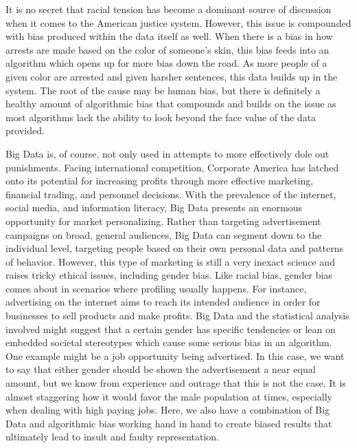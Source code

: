 \documentclass[sigconf]{acmart}
\begin{document}
It is no secret that racial tension has become a dominant source of discussion when it comes to the American justice system. However, this issue is compounded with bias produced within the data itself as well. When there is a bias in how arrests are made based on the color of someone's skin, this bias feeds into an algorithm which opens up for more bias down the road. As more people of a given color are arrested and given harsher sentences, this data builds up in the system. The root of the cause may be human bias, but there is definitely a healthy amount of algorithmic bias that compounds and builds on the issue as most algorithms lack the ability to look beyond the face value of the data provided\cite{Eckhouse2017}.

Big Data is, of course, not only used in attempts to more effectively dole out punishments. Facing international competition, Corporate America has latched onto its potential for increasing profits through more effective marketing, financial trading, and personnel decisions. With the prevalence of the internet, social media, and information literacy, Big Data presents an enormous opportunity for market personalizing. Rather than targeting advertisement campaigns on broad, general audiences, Big Data can segment down to the individual level, targeting people based on their own personal data and patterns of behavior. However, this type of marketing is still a very inexact science and raises tricky ethical issues, including gender bias. Like racial bias, gender bias comes about in scenarios where profiling usually happens. For instance, advertising on the internet aims to reach its intended audience in order for businesses to sell products and make profits. Big Data and the statistical analysis involved might suggest that a certain gender has specific tendencies or lean on embedded societal stereotypes which cause some serious bias in an algorithm. One example might be a job opportunity being advertised. In this case, we want to say that either gender should be shown the advertisement a near equal amount, but we know from experience and outrage that this is not the case. It is almost staggering how it would favor the male population at times, especially when dealing with high paying jobs. Here, we also have a combination of Big Data and algorithmic bias working hand in hand to create biased results that ultimately lead to insult and faulty representation\cite{Brown2017}.
\end{document}
